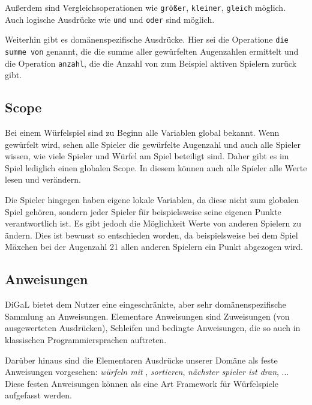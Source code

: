 	Außerdem sind Vergleichsoperationen wie \texttt{größer}, \texttt{kleiner}, \texttt{gleich} möglich. Auch logische Ausdrücke wie \texttt{und} und \texttt{oder} sind möglich.
	
	Weiterhin gibt es domänenspezifische Ausdrücke. Hier sei die Operatione \texttt{die summe von} genannt, die die summe aller gewürfelten Augenzahlen ermittelt und die Operation \texttt{anzahl}, die die Anzahl von zum Beispiel aktiven Spielern zurück gibt.


\subsection{Scope} %
\label{sub:scope}
	Bei einem Würfelspiel sind zu Beginn alle Variablen global bekannt. Wenn gewürfelt wird, sehen alle Spieler die gewürfelte Augenzahl und auch alle Spieler wissen, wie viele Spieler und Würfel am Spiel beteiligt sind. Daher gibt es im Spiel lediglich einen globalen Scope. In diesem können auch alle Spieler alle Werte lesen und verändern.
	
	Die Spieler hingegen haben eigene lokale Variablen, da diese nicht zum globalen Spiel gehören, sondern jeder Spieler für beispielsweise seine eigenen Punkte verantwortlich ist. Es gibt jedoch die Möglichkeit Werte von anderen Spielern zu ändern. Dies ist bewusst so entschieden worden, da beispielsweise bei dem Spiel Mäxchen bei der Augenzahl 21 allen anderen Spielern ein Punkt abgezogen wird.


\subsection{Anweisungen} %
\label{sub:anweisungen}
DiGaL bietet dem Nutzer eine eingeschränkte, aber sehr domänenspezifische Sammlung an Anweisungen. Elementare Anweisungen sind Zuweisungen (von ausgewerteten Ausdrücken), Schleifen und bedingte Anweisungen, die so auch in klassischen Programmiersprachen auftreten.

Darüber hinaus sind die Elementaren Ausdrücke unserer Domäne als feste Anweisungen vorgesehen: \emph{würfeln mit }, \emph{sortieren}, \emph{nächster spieler ist dran}, ... Diese festen Anweisungen können als eine Art Framework für Würfelspiele aufgefasst werden.







